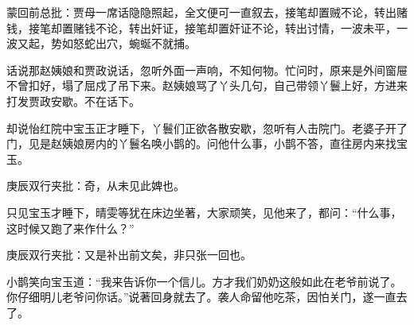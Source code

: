 \begin{parag}

    \begin{note}蒙回前总批：贾母一席话隐隐照起，全文便可一直叙去，接笔却置贼不论，转出赌钱，接笔却置赌钱不论，转出奸证，接笔却置奸证不论，转出讨情，一波未平，一波又起，势如怒蛇出穴，蜿蜒不就捕。\end{note}
\end{parag}

\begin{parag}

    话说那赵姨娘和贾政说话，忽听外面一声响，不知何物。忙问时，原来是外间窗屉不曾扣好，塌了屈戍了吊下来。赵姨娘骂了丫头几句，自己带领丫鬟上好，方进来打发贾政安歇。不在话下。
\end{parag}


\begin{parag}


    却说怡红院中宝玉正才睡下，丫鬟们正欲各散安歇，忽听有人击院门。老婆子开了门，见是赵姨娘房内的丫鬟名唤小鹊的。问他什么事，小鹊不答，直往房内来找宝玉。\begin{note}庚辰双行夹批：奇，从未见此婢也。\end{note}只见宝玉才睡下，晴雯等犹在床边坐著，大家顽笑，见他来了，都问：“什么事，这时候又跑了来作什么？”\begin{note}庚辰双行夹批：又是补出前文矣，非只张一回也。\end{note}小鹊笑向宝玉道：“我来告诉你一个信儿。方才我们奶奶这般如此在老爷前说了。你仔细明儿老爷问你话。”说著回身就去了。袭人命留他吃茶，因怕关门，遂一直去了。
\end{parag}


